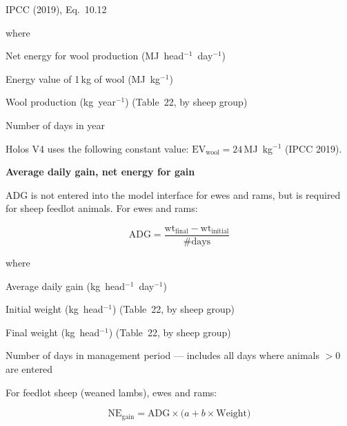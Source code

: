 \noindent IPCC (2019), Eq.~10.12

\noindent where
\begin{description}[font=\normalfont, leftmargin=9em, style=sameline, nosep]
    \item[$\mathrm{NE}_{\mathrm{wool}}$] Net energy for wool production
          (MJ~head$^{-1}$~day$^{-1}$)
    \item[$\mathrm{EV}_{\mathrm{wool}}$] Energy value of 1\,kg of wool (MJ~kg$^{-1}$)
    \item[$\mathrm{wool}_{\mathrm{prod}}$] Wool production (kg~year$^{-1}$) (Table~22,
          by sheep group)
    \item[$365$] Number of days in year
\end{description}

\noindent Holos V4 uses the following constant value:
$\mathrm{EV}_{\mathrm{wool}} = 24$\,MJ~kg$^{-1}$ (IPCC 2019).

\bigskip
\noindent\textbf{Average daily gain, net energy for gain}

ADG is not entered into the model interface for ewes and rams, but is required for
sheep feedlot animals. For ewes and rams:

\begin{equation}
    \mathrm{ADG} = \frac{\mathrm{wt}_{\mathrm{final}} - \mathrm{wt}_{\mathrm{initial}}}
                        {\#\mathrm{days}}
    \tag{Eq.\ 3.3.1.9}
\end{equation}

\noindent where
\begin{description}[font=\normalfont, leftmargin=9em, style=sameline, nosep]
    \item[$\mathrm{ADG}$] Average daily gain (kg~head$^{-1}$~day$^{-1}$)
    \item[$\mathrm{wt}_{\mathrm{initial}}$] Initial weight (kg~head$^{-1}$) (Table~22,
          by sheep group)
    \item[$\mathrm{wt}_{\mathrm{final}}$] Final weight (kg~head$^{-1}$) (Table~22,
          by sheep group)
    \item[$\#\mathrm{days}$] Number of days in management period --- includes all days
          where animals $> 0$ are entered
\end{description}

\noindent For feedlot sheep (weaned lambs), ewes and rams:

\begin{equation}
    \mathrm{NE}_{\mathrm{gain}} =
        \mathrm{ADG} \times \bigl(a + b \times \mathrm{Weight}\bigr)
    \tag{Eq.\ 3.3.1.10}
\end{equation}

